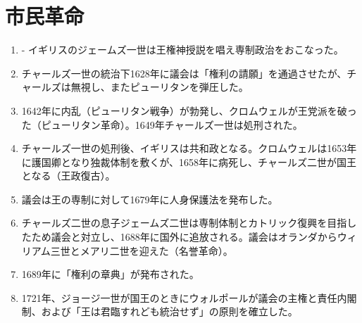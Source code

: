 \documentclass[twocolumn,autodetect-engine,dvipdfmx-if-dvi,ja=standard]{jsarticle} \usepackage{mystyle}
\begin{document}
\section{市民革命}


\begin{enumerate}
\item - イギリスのジェームズ一世は王権神授説を唱え専制政治をおこなった。
\item チャールズ一世の統治下1628年に議会は「権利の請願」を通過させたが、チャールズは無視し、またピューリタンを弾圧した。
\item 1642年に内乱（ピューリタン戦争）が勃発し、クロムウェルが王党派を破った（ピューリタン革命）。1649年チャールズ一世は処刑された。
\item チャールズ一世の処刑後、イギリスは共和政となる。クロムウェルは1653年に護国卿となり独裁体制を敷くが、1658年に病死し、チャールズ二世が国王となる（王政復古）。
\item 議会は王の専制に対して1679年に人身保護法を発布した。
\item チャールズ二世の息子ジェームズ二世は専制体制とカトリック復興を目指したため議会と対立し、1688年に国外に追放される。議会はオランダからウィリアム三世とメアリ二世を迎えた（名誉革命）。
\item 1689年に「権利の章典」が発布された。
\item 1721年、ジョージ一世が国王のときにウォルポールが議会の主権と責任内閣制、および「王は君臨すれども統治せず」の原則を確立した。

\end{enumerate}
\end{document}
